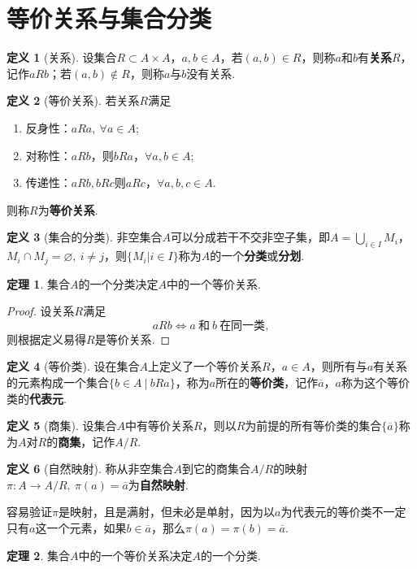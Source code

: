 \documentclass[12pt]{ctexart}
\theoremstyle{definition}
\newtheorem{definition}{定义}[section]
\newtheorem{theorem}{定理}[section]
\theoremstyle{plain}
\begin{document}
\section{等价关系与集合分类}
\begin{definition}[关系]
	设集合$R\subset A\times A$，$a,b\in A$，若$(a,b)\in R$，则称$a$和$b$有\textbf{关系}$R$，记作$aRb$；若$(a,b)\notin R$，则称$a$与$b$没有关系.
\end{definition}
\begin{definition}[等价关系]
	若关系$R$满足
	\begin{enumerate}
		\item 反身性：$aRa,\ \forall a\in A$;
		\item 对称性：$aRb$，则$bRa$，$\forall a,b\in A$;
		\item 传递性：$aRb,bRc$则$aRc$，$\forall a,b,c\in A$.
	\end{enumerate}
	则称$R$为\textbf{等价关系}.
\end{definition}
\begin{definition}[集合的分类]
	非空集合$A$可以分成若干不交非空子集，即$A=\bigcup_{i\in I}M_i$，$M_i\cap M_j=\varnothing,\ i\neq j$，则$\{M_i|i\in I\}$称为$A$的一个\textbf{分类}或\textbf{分划}.
\end{definition}
\begin{theorem}
	集合$A$的一个分类决定$A$中的一个等价关系.
\end{theorem}
\begin{proof}
	设关系$R$满足
	$$aRb\iff a\ \text{和}\ b\ \text{在同一类},$$
	则根据定义易得$R$是等价关系.
\end{proof}
\begin{definition}[等价类]
	设在集合$A$上定义了一个等价关系$R$，$a\in A$，则所有与$a$有关系的元素构成一个集合$\{b\in A\ |\ bRa\}$，称为$a$所在的\textbf{等价类}，记作$\overline{a}$，$a$称为这个等价类的\textbf{代表元}.
\end{definition}
\begin{definition}[商集]
	设集合$A$中有等价关系$R$，则以$R$为前提的所有等价类的集合$\{\overline{a}\}$称为$A$对$R$的\textbf{商集}，记作$A/R$.
\end{definition}
\begin{definition}[自然映射]
	称从非空集合$A$到它的商集合$A/R$的映射$\pi:A\to A/R,\ \pi(a)=\overline{a}$为\textbf{自然映射}.
\end{definition}
容易验证$\pi$是映射，且是满射，但未必是单射，因为以$a$为代表元的等价类不一定只有$a$这一个元素，如果$b\in\overline{a}$，那么$\pi(a)=\pi(b)=\overline{a}$.
\begin{theorem}
	集合$A$中的一个等价关系决定$A$的一个分类.
\end{theorem}
\end{document}
